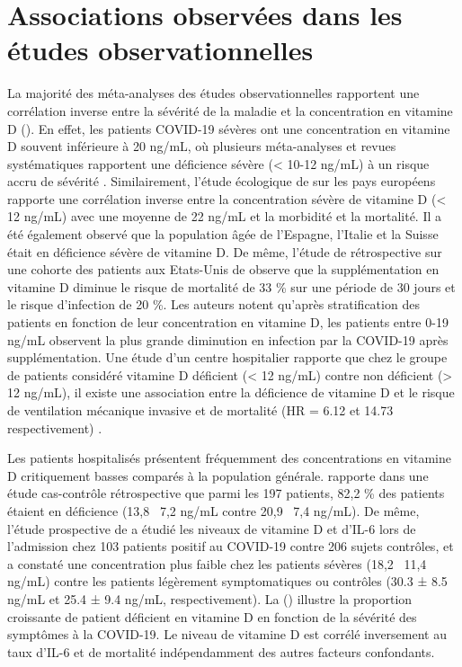\documentclass[
  a4paper,
  DIV=11,
  numbers=noendperiod,
  listof=totoc]{scrreprt}
\begin{document}
\section{Associations observées dans les études
observationnelles}\label{associations-observuxe9es-dans-les-uxe9tudes-observationnelles}

La majorité des méta-analyses des études observationnelles rapportent
une corrélation inverse entre la sévérité de la maladie et la
concentration en vitamine D (). En effet,
les patients COVID-19 sévères ont une concentration en vitamine D
souvent inférieure à 20 ng/mL, où plusieurs méta-analyses et revues
systématiques rapportent une déficience sévère (\textless{} 10-12 ng/mL)
à un risque accru de sévérité
\autocite{Contreras-Bolívar.2023, Borsche.2021,
Crafa.2021, DEcclesiis.2022, Pal.2022, Hariyanto.2022, Ghelani.2021}.
Similairement, l'étude écologique de \textcite{Ilie.2020} sur les pays
européens rapporte une corrélation inverse entre la concentration sévère
de vitamine D (\textless{} 12 ng/mL) avec une moyenne de 22 ng/mL et la
morbidité et la mortalité. Il a été également observé que la population
âgée de l'Espagne, l'Italie et la Suisse était en déficience sévère de
vitamine D. De même, l'étude de rétrospective sur une cohorte des
patients aux Etats-Unis de \textcite{Gibbons.2022} observe que la
supplémentation en vitamine D diminue le risque de mortalité de 33 \%
sur une période de 30 jours et le risque d'infection de 20 \%. Les
auteurs notent qu'après stratification des patients en fonction de leur
concentration en vitamine D, les patients entre 0-19 ng/mL observent la
plus grande diminution en infection par la COVID-19 après
supplémentation. Une étude d'un centre hospitalier rapporte que chez le
groupe de patients considéré vitamine D déficient (\textless{} 12 ng/mL)
contre non déficient (\textgreater{} 12 ng/mL), il existe une
association entre la déficience de vitamine D et le risque de
ventilation mécanique invasive et de mortalité (HR = 6.12 et 14.73
respectivement) \autocite{Radujkovic.2020}.

Les patients hospitalisés présentent fréquemment des concentrations en
vitamine D critiquement basses comparés à la population générale.
\textcite{Hernández.2020} rapporte dans une étude cas-contrôle
rétrospective que parmi les 197 patients, 82,2 \% des patients étaient
en déficience (13,8 \pm ~7,2 ng/mL contre 20,9 \pm ~7,4 ng/mL). De même,
l'étude prospective de \textcite{Campi.2021} a étudié les niveaux de
vitamine D et d'IL-6 lors de l'admission chez 103 patients positif au
COVID-19 contre 206 sujets contrôles, et a constaté une concentration
plus faible chez les patients sévères (18,2 \pm ~11,4 ng/mL) contre les
patients légèrement symptomatiques ou contrôles (30.3 ± 8.5 ng/mL et
25.4 ± 9.4 ng/mL, respectivement). La ()
illustre la proportion croissante de patient déficient en vitamine D en
fonction de la sévérité des symptômes à la COVID-19. Le niveau de
vitamine D est corrélé inversement au taux d'IL-6 et de mortalité
indépendamment des autres facteurs confondants.
\end{document}
